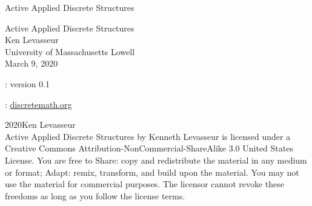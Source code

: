 \documentclass[oneside,10pt,]{book}
\newcommand{\titlepagefont}{\relax}
\numberwithin{equation}{section}
\begin{document}
\frontmatter
\thispagestyle{empty}
{\titlepagefont\centering
\vspace*{0.28\textheight}
{\Huge Active Applied Discrete Structures}\\}
\clearpage
\thispagestyle{empty}
\null%
\clearpage
\thispagestyle{empty}
{\titlepagefont\centering
\vspace*{0.14\textheight}
{\Huge Active Applied Discrete Structures}\\[3\baselineskip]
{\Large Ken Levasseur}\\[0.5\baselineskip]
{\Large University of Massachusetts Lowell}\\[3\baselineskip]
{\Large March 9, 2020}\\}
\clearpage
\thispagestyle{empty}
\hypertarget{g:colophon:idm411251057456}{}
: version 0.1\par\medskip
{}: \href{http:\slash{}\slash{}discretemath.org}{discretemath.org}\par\medskip
\noindent\textcopyright{}2020\quad{}Ken Levasseur\\[0.5\baselineskip]
Active Applied Discrete Structures by Kenneth Levasseur is licensed under a Creative Commons Attribution-NonCommercial-ShareAlike 3.0 United States License. You are free to Share: copy and redistribute the material in any medium or format; Adapt: remix, transform, and build upon the material. You may not use the material for commercial purposes.  The licensor cannot revoke these freedoms as long as you follow the license terms.\par\medskip
{}
\null\clearpage
%
%
\typeout{************************************************}
\typeout{************************************************}
%
\end{document}
